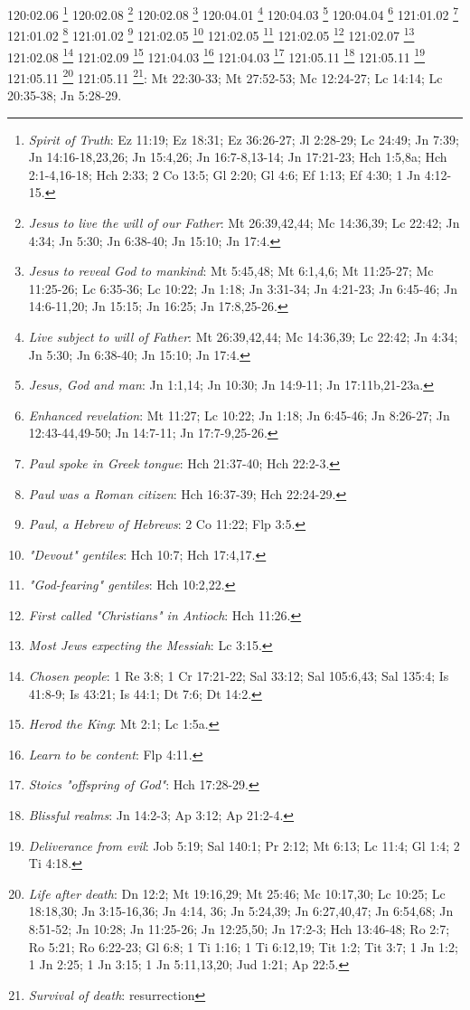 {{{120:02.06 \footnote{\textit{Spirit of Truth}: Ez 11:19; Ez 18:31; Ez 36:26-27; Jl 2:28-29; Lc 24:49; Jn 7:39; Jn 14:16-18,23,26; Jn 15:4,26; Jn 16:7-8,13-14; Jn 17:21-23; Hch 1:5,8a; Hch 2:1-4,16-18; Hch 2:33; 2 Co 13:5; Gl 2:20; Gl 4:6; Ef 1:13; Ef 4:30; 1 Jn 4:12-15.}
120:02.08 \footnote{\textit{Jesus to live the will of our Father}: Mt 26:39,42,44; Mc 14:36,39; Lc 22:42; Jn 4:34; Jn 5:30; Jn 6:38-40; Jn 15:10; Jn 17:4.}
120:02.08 \footnote{\textit{Jesus to reveal God to mankind}: Mt 5:45,48; Mt 6:1,4,6; Mt 11:25-27; Mc 11:25-26; Lc 6:35-36; Lc 10:22; Jn 1:18; Jn 3:31-34; Jn 4:21-23; Jn 6:45-46; Jn 14:6-11,20; Jn 15:15; Jn 16:25; Jn 17:8,25-26.}
120:04.01 \footnote{\textit{Live subject to will of Father}: Mt 26:39,42,44; Mc 14:36,39; Lc 22:42; Jn 4:34; Jn 5:30; Jn 6:38-40; Jn 15:10; Jn 17:4.}
120:04.03 \footnote{\textit{Jesus, God and man}: Jn 1:1,14; Jn 10:30; Jn 14:9-11; Jn 17:11b,21-23a.}
120:04.04 \footnote{\textit{Enhanced revelation}: Mt 11:27; Lc 10:22; Jn 1:18; Jn 6:45-46; Jn 8:26-27; Jn 12:43-44,49-50; Jn 14:7-11; Jn 17:7-9,25-26.}
121:01.02 \footnote{\textit{Paul spoke in Greek tongue}: Hch 21:37-40; Hch 22:2-3.}
121:01.02 \footnote{\textit{Paul was a Roman citizen}: Hch 16:37-39; Hch 22:24-29.}
121:01.02 \footnote{\textit{Paul, a Hebrew of Hebrews}: 2 Co 11:22; Flp 3:5.}
121:02.05 \footnote{\textit{"Devout" gentiles}: Hch 10:7; Hch 17:4,17.}
121:02.05 \footnote{\textit{"God-fearing" gentiles}: Hch 10:2,22.}
121:02.05 \footnote{\textit{First called "Christians" in Antioch}: Hch 11:26.}
121:02.07 \footnote{\textit{Most Jews expecting the Messiah}: Lc 3:15.}
121:02.08 \footnote{\textit{Chosen people}: 1 Re 3:8; 1 Cr 17:21-22; Sal 33:12; Sal 105:6,43; Sal 135:4; Is 41:8-9; Is 43:21; Is 44:1; Dt 7:6; Dt 14:2.}
121:02.09 \footnote{\textit{Herod the King}: Mt 2:1; Lc 1:5a.}
121:04.03 \footnote{\textit{Learn to be content}: Flp 4:11.}
121:04.03 \footnote{\textit{Stoics "offspring of God"}: Hch 17:28-29.}
121:05.11 \footnote{\textit{Blissful realms}: Jn 14:2-3; Ap 3:12; Ap 21:2-4.}
121:05.11 \footnote{\textit{Deliverance from evil}: Job 5:19; Sal 140:1; Pr 2:12; Mt 6:13; Lc 11:4; Gl 1:4; 2 Ti 4:18.}
121:05.11 \footnote{\textit{Life after death}: Dn 12:2; Mt 19:16,29; Mt 25:46; Mc 10:17,30; Lc 10:25; Lc 18:18,30; Jn 3:15-16,36; Jn 4:14, 36; Jn 5:24,39; Jn 6:27,40,47; Jn 6:54,68; Jn 8:51-52; Jn 10:28; Jn 11:25-26; Jn 12:25,50; Jn 17:2-3; Hch 13:46-48; Ro 2:7; Ro 5:21; Ro 6:22-23; Gl 6:8; 1 Ti 1:16; 1 Ti 6:12,19; Tit 1:2; Tit 3:7; 1 Jn 1:2; 1 Jn 2:25; 1 Jn 3:15; 1 Jn 5:11,13,20; Jud 1:21; Ap 22:5.}
121:05.11 \footnote{\textit{Survival of death}: resurrection}: Mt 22:30-33; Mt 27:52-53; Mc 12:24-27; Lc 14:14; Lc 20:35-38; Jn 5:28-29.}
}}
